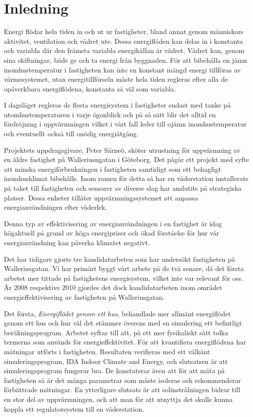 \chapter{Inledning}

Energi flödar hela tiden in och ut ur fastigheter, bland annat genom människors aktivitet, ventilation och vädret ute. Dessa energiflöden kan delas in i konstanta och variabla där den främsta variabla energikällan är vädret. Vädret kan, genom sina skiftningar, både ge och ta energi från byggnaden. För att bibehålla en jämn inomhustemperatur i fastigheten kan inte en konstant mängd energi tillföras av värmesystemet, utan energitillförseln måste hela tiden regleras efter alla de opåverkbara energiflödena, konstanta så väl som variabla.

I dagsläget regleras de flesta energisystem i fastigheter endast med tanke på utomhustemperaturen i varje ögonblick och på så sätt blir det alltid en fördröjning i uppvärmningen vilket i vårt fall leder till ojämn inomhustemperatur och eventuellt också till onödig energiåtgång.

Projektets uppdragsgivare, Peter Särneö, sköter utrustning för uppvärmning av en äldre fastighet på Walleriusngatan i Göteborg. Det pågår ett projekt med syfte att minska energiförbrukningen i fastigheten samtidigt som ett behagligt inomhusklimat bibehålls. Inom ramen för detta så har en väderstation installerats på taket till fastigheten och sensorer av diverse slag har anslutits på strategiska platser.
 Dessa enheter tillåter uppvärmningssystemet att anpassa energianvändningen efter väderlek. %

Denna typ av effektivisering av energianvändningen i en fastighet är idag högaktuell på grund av höga energipriser och ökad förståelse för hur vår energianvändning kan påverka klimatet negativt.

Det har tidigare gjorts tre kandidatarbeten som har undersökt fastigheten på Walleriusgatan. Vi har primärt byggt vårt arbete på de två senare, då det första arbetet mer tittade på fastighetens energisystem, vilket inte var relevant för oss. År 2008 respektive 2010 gjordes det dock kandidatarbeten inom området energieffektivisering av fastigheten på Walleriusgatan. 

Det första, \textit{Energiflödet genom ett hus}\cite{kandidatarbete2008},
behandlade mer allmänt energiflödet genom ett hus och hur väl det stämmer
överens med en simulering ett befintligt beräkningsprogram. Arbetet syftar
till att, på ett mer fysikaliskt sätt tolka termerna som används för
energieffektivitet. För att kvantifiera energiflödena har mätningar utförts i
fastigheten. Resultaten verifieras med ett välkänt simuleringsprogram,
IDA Indoor Climate and Energy, och slutsatsen är att simuleringsprogram fungerar bra.
De konstaterar även att för att mäta på fastigheten så är det många parametrar som
måste isoleras och rekommenderar förbättrade mätningar.
 En ytterligare slutsats är att solinstrålningen bidrar till en stor del av
uppvärmningen, och att man för att utnyttja det skulle kunna koppla ett
regulatorsystem till en väderstation.

